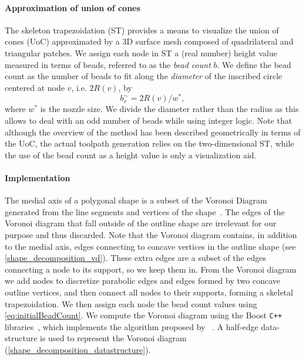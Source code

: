 \paragraph{Approximation of union of cones}
The skeleton trapezoidation (ST) provides a means to visualize the union of cones (UoC) approximated by a 3D surface mesh composed of quadrilateral and triangular patches.
We assign each node in ST a (real number) height value measured in terms of beads, referred to as the \emph{bead count} $b$.
We define the bead count as the number of beads to fit along the \emph{diameter} of the inscribed circle centered at node $v$, i.e. $2R(v)$, by
\begin{equation}
    b^\sim_v = 2 R(v) / w^*,
\label{eq:initialBeadCount}
\end{equation}
where $w^*$ is the nozzle size. 
We divide the diameter rather than the radius as this allows to deal with an odd number of beads while using integer logic.
Note that although the overview of the method has been described geometrically in terms of the UoC, the actual toolpath generation relies on the two-dimensional ST, while the use of the bead count as a height value is only a visualization aid.







\paragraph{Implementation}
The medial axis of a polygonal shape is a subset of the Voronoi Diagram generated from the line segments and vertices of the shape~\cite{lee1982medial}. 
The edges of the Voronoi diagram that fall outside of the outline shape are irrelevant for our purpose and thus discarded.
Note that the Voronoi diagram contains, in addition to the medial axis, edges connecting to concave vertices in the outline shape (see \cref{shape_decomposition_vd}). 
These extra edges are a subset of the edges connecting a node to its support, so we keep them in.
From the Voronoi diagram we add nodes to discretize parabolic edges and edges formed by two concave outline vertices, and then connect all nodes to their supports, forming a skeletal trapezoidation. 
We then assign each node the bead count values using \cref{eq:initialBeadCount}.
We compute the Voronoi diagram using the Boost \verb!C++! libraries~\cite{schaling2011boost}, which implements the algorithm proposed by \citeauthor{fortune1986sascg}~\cite{fortune1986sascg}.
A half-edge data-structure is used to represent the Voronoi diagram (\cref{shape_decomposition_datastructure}).

